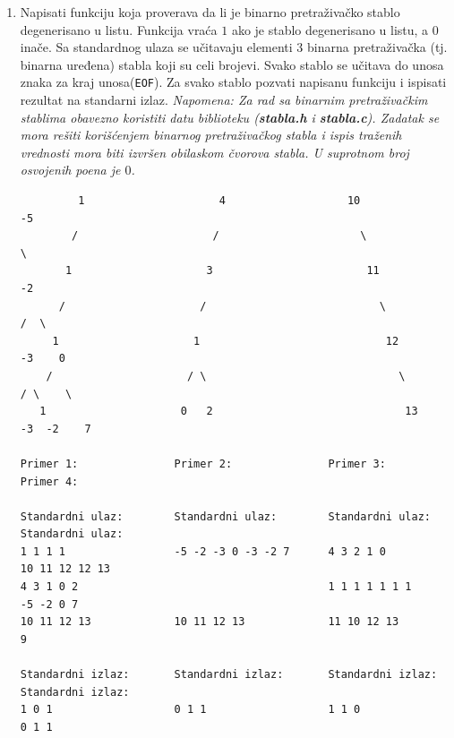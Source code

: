 \begin{enumerate}
\item Napisati funkciju koja proverava da li je binarno pretraživačko stablo degenerisano u listu. Funkcija vraća $1$ ako je stablo degenerisano u listu, a $0$ inače. Sa standardnog ulaza se učitavaju elementi 3 binarna pretraživačka (tj. binarna uređena) stabla koji su celi brojevi. Svako stablo se učitava do unosa znaka za kraj unosa(\texttt{EOF}). Za svako stablo pozvati napisanu funkciju i ispisati rezultat na standarni izlaz. \textit{Napomena: Za rad sa binarnim pretraživačkim stablima obavezno koristiti datu biblioteku (\textbf{stabla.h} i \textbf{stabla.c}). Zadatak se mora rešiti korišćenjem binarnog pretraživačkog stabla i ispis traženih vrednosti mora biti izvršen obilaskom čvorova stabla. U suprotnom broj osvojenih poena je $0$.}
\begin{verbatim}
         1                     4                   10                        -5      
        /                     /                      \                         \
       1                     3                        11                       -2
      /                     /                           \                     /  \
     1                     1                             12                 -3    0
    /                     / \                              \                / \    \
   1                     0   2                              13            -3  -2    7

Primer 1:               Primer 2:               Primer 3:               Primer 4:                

Standardni ulaz:        Standardni ulaz:        Standardni ulaz:        Standardni ulaz: 
1 1 1 1                 -5 -2 -3 0 -3 -2 7      4 3 2 1 0               10 11 12 12 13
4 3 1 0 2                                       1 1 1 1 1 1 1           -5 -2 0 7
10 11 12 13             10 11 12 13             11 10 12 13             9

Standardni izlaz:       Standardni izlaz:       Standardni izlaz:       Standardni izlaz:        
1 0 1                   0 1 1                   1 1 0                   0 1 1
\end{verbatim}  
 
\end{enumerate} 